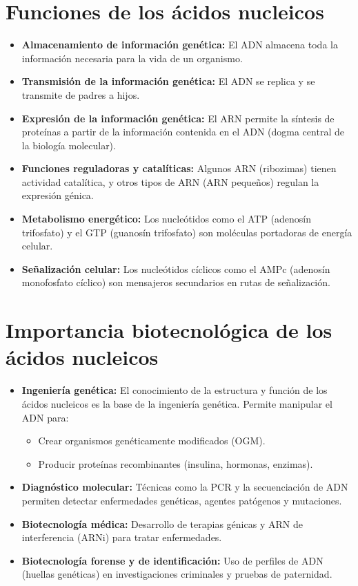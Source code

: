 \section{Funciones de los ácidos nucleicos}

\begin{itemize}
    \item \textbf{Almacenamiento de información genética:} El ADN almacena toda la información necesaria para la vida de un organismo.
    \item \textbf{Transmisión de la información genética:} El ADN se replica y se transmite de padres a hijos.
    \item \textbf{Expresión de la información genética:} El ARN permite la síntesis de proteínas a partir de la información contenida en el ADN (dogma central de la biología molecular).
    \item \textbf{Funciones reguladoras y catalíticas:} Algunos ARN (ribozimas) tienen actividad catalítica, y otros tipos de ARN (ARN pequeños) regulan la expresión génica.
    \item \textbf{Metabolismo energético:} Los nucleótidos como el ATP (adenosín trifosfato) y el GTP (guanosín trifosfato) son moléculas portadoras de energía celular.
    \item \textbf{Señalización celular:} Los nucleótidos cíclicos como el AMPc (adenosín monofosfato cíclico) son mensajeros secundarios en rutas de señalización.
\end{itemize}

\section{Importancia biotecnológica de los ácidos nucleicos}

\begin{itemize}
    \item \textbf{Ingeniería genética:} El conocimiento de la estructura y función de los ácidos nucleicos es la base de la ingeniería genética. Permite manipular el ADN para:
    \begin{itemize}
        \item Crear organismos genéticamente modificados (OGM).
        \item Producir proteínas recombinantes (insulina, hormonas, enzimas).
    \end{itemize}
    \item \textbf{Diagnóstico molecular:} Técnicas como la PCR y la secuenciación de ADN permiten detectar enfermedades genéticas, agentes patógenos y mutaciones.
    \item \textbf{Biotecnología médica:} Desarrollo de terapias génicas y ARN de interferencia (ARNi) para tratar enfermedades.
    \item \textbf{Biotecnología forense y de identificación:} Uso de perfiles de ADN (huellas genéticas) en investigaciones criminales y pruebas de paternidad.
\end{itemize}